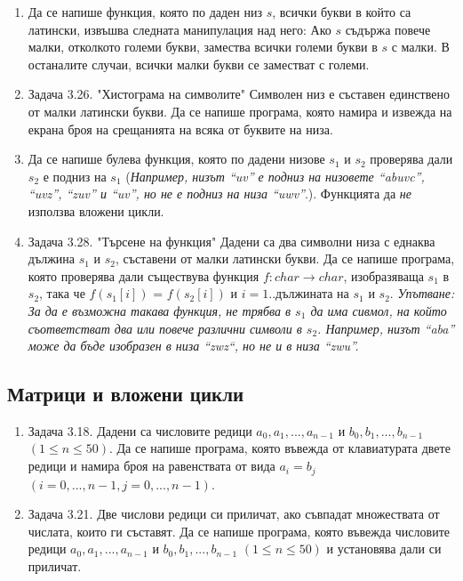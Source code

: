 {\begin{enumerate}[resume]
  \item Да се напише функция, която по даден низ $s$, всички букви в който са латински, извъшва следната манипулация над него: Ако $s$ съдържа повече малки, отколкото големи букви, замества всички големи букви в $s$ с малки. В останалите случаи, всички малки букви се заместват с големи.

	\item Задача 3.26. "Хистограма на символите" \cite{sbornik} Символен низ е съставен единствено от малки латински букви. Да се напише програма, която намира и извежда на екрана броя на срещанията на всяка от буквите на низа.

  \item Да се напише булева функция, която по дадени низове $s_1$ и $s_2$ проверява дали $s_2$ е подниз на $s_1$ (\textit{Например, низът ``uv'' е подниз на низовете ``abuvc'', ``uvz'', ``zuv'' и ``uv'', но не е подниз на низа ``uwv''}.). Функцията да \emph{не} използва вложени цикли.

  \item Задача 3.28. "Търсене на функция" \cite{sbornik} Дадени са два символни низа с еднаква дължина $s_1$ и $s_2$, съставени от малки латински букви. Да се напише програма, която проверява дали съществува функция $f:char \rightarrow char$, изобразяваща $s_1$ в $s_2$, така че $f(s_1[i])$ = $f(s_2[i])$ и $i=1..$дължината на $s_1$ и $s_2$. \textit{Упътване: За да е възможна такава функция, не трябва в $s_1$ да има сивмол, на който съответстват два или повече различни символи в $s_2$. Например, низът ``aba'' може да бъде изобразен в низа ``zwz``, но не и в низа ``zwu''.}

\end{enumerate}


\pagebreak

\subsection {Матрици и вложени цикли}

\begin{enumerate}[resume]

	\item Задача 3.18. \cite{sbornik} Дадени са числовите редици $a_0, a_1, ..., a_{n-1}$ и $b_0, b_1, ..., b_{n-1}$ $(1 \leq n \leq 50)$. Да се напише програма, която въвежда от клавиатурата двете редици и намира броя на равенствата от вида $a_i = b_j$ $(i = 0, ..., n-1, j = 0, ..., n-1)$.

	\item Задача 3.21. \cite{sbornik} Две числови редици си приличат, ако съвпадат множествата от числата, които ги съставят. Да се напише програма, която въвежда числовите редици $a_0, a_1, ..., a_{n-1}$ и $b_0, b_1, ..., b_{n-1}$ $(1 \leq n \leq 50)$ и установява дали си приличат.


\end{enumerate}}
